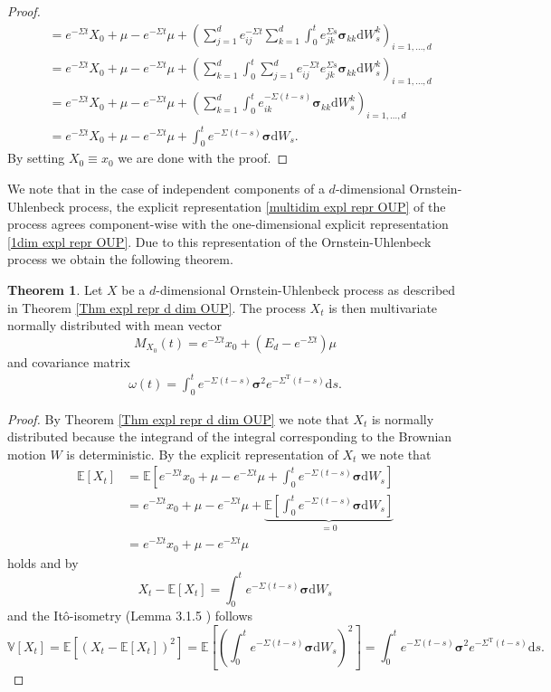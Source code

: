 \documentclass[11pt,titlepage]{article}
\newcommand{\E}{\mathbb{E}} %
\newcommand{\V}{\mathbb{V}} %
\theoremstyle{definition}
\newtheorem{theorem}{Theorem}[section]
\theoremstyle{remark}
\begin{document}
\begin{proof}
\begin{align*}
			&=e^{-\Sigma t}X_0 +\mu -e^{-\Sigma t}\mu +\left(\sum_{j=1}^d e^{-\Sigma t}_{ij}\sum_{k=1}^d\int_0^t 
			e^{\Sigma s}_{jk}\boldsymbol{\sigma}_{kk}\mathrm{d}W_s^k\right)_{i=1,\ldots,d}\\
			&=e^{-\Sigma t}X_0 +\mu -e^{-\Sigma t}\mu +\left(\sum_{k=1}^d\int_0^t\sum_{j=1}^d e^{-\Sigma t}_{ij} 
			e^{\Sigma s}_{jk}\boldsymbol{\sigma}_{kk}\mathrm{d}W_s^k\right)_{i=1,\ldots,d}\\
			&=e^{-\Sigma t}X_0 +\mu -e^{-\Sigma t}\mu +\left(\sum_{k=1}^d\int_0^t e^{-\Sigma(t-s) }_{ik} \boldsymbol{\sigma}_{kk}\mathrm{d}W_s^k\right)_{i=1,\ldots,d}\\
			&= e^{-\Sigma t}X_0+\mu-e^{-\Sigma t}\mu+\int_0^t e^{-\Sigma(t-s)}\boldsymbol{\sigma}\mathrm{d}W_s.
		\end{align*} 
		By setting $X_0\equiv x_0$ we are done with the proof.
	\end{proof}
	
	We note that in the case of independent components of a $d$-dimensional Ornstein-Uhlenbeck process, the explicit representation \ref{multidim expl repr OUP} of the process agrees component-wise with the one-dimensional explicit representation \ref{1dim expl repr OUP}. 
	Due to this representation of the Ornstein-Uhlenbeck process we obtain the following theorem.
	
	\begin{theorem}
		Let $X$ be a $d$-dimensional Ornstein-Uhlenbeck process as described in Theorem \ref{Thm expl repr d dim OUP}. The process $X_t$ is then multivariate normally distributed with 
		mean vector 
		\[M_{X_0}(t) = e^{-\Sigma t} x_0 + (E_d -e^{-\Sigma t})\mu\]
		and covariance matrix
		\begin{align*}
			\omega(t) = \int_{0}^t e^{-\Sigma (t-s)}\boldsymbol{\sigma}^2 e^{-\Sigma^\text{T}(t-s)}\mathrm{d}s.
		\end{align*}
	\end{theorem}
		
	\begin{proof}
		By Theorem \ref{Thm expl repr d dim OUP} we note that $X_t$ is normally distributed because the integrand of the integral corresponding to the Brownian motion $W$ is deterministic. 
		By the explicit representation of $X_t$ we note that
		\begin{align*}
			\E[X_t] &= \E\left[e^{-\Sigma t}x_0+\mu-e^{-\Sigma t}\mu+\int_0^t e^{-\Sigma(t-s)}\boldsymbol{\sigma}\mathrm{d}W_s\right]\\
			&=e^{-\Sigma t}x_0+\mu-e^{-\Sigma t}\mu +\underbrace{\E\left[\int_0^t e^{-\Sigma(t-s)}\boldsymbol{\sigma}\mathrm{d}W_s\right]}_{=0}\\
			&=e^{-\Sigma t}x_0+\mu-e^{-\Sigma t}\mu
		\end{align*}
		holds and by
		\[X_t-\E[X_t]= \int_0^t e^{-\Sigma(t-s)}\boldsymbol{\sigma}\mathrm{d}W_s\]
		and the Itô-isometry (Lemma 3.1.5 \cite{Oksendal2002}) follows
		\[\V[X_t]=\E[(X_t -\E[X_t])^2] = \E\left[\left(\int_0^t e^{-\Sigma(t-s)}\boldsymbol{\sigma}\mathrm{d}W_s\right)^2\right] = \int_0^t e^{-\Sigma(t-s)}\boldsymbol{\sigma}^2 e^{-\Sigma^\text{T}(t-s)}\mathrm{d}s.\]
	\end{proof}
	
\end{document}

